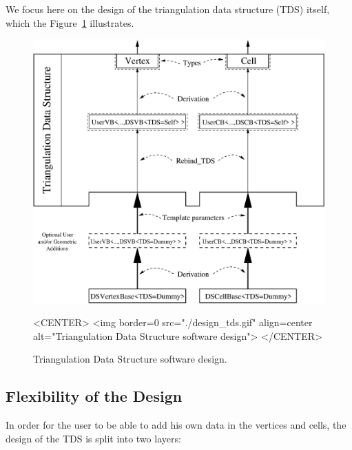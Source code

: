 We focus here on the design of the triangulation data structure (TDS)
itself, which the Figure~\ref{TDS3-fig-layers} illustrates.

\begin{figure}[htbp]
\begin{ccTexOnly}
\begin{center}
\includegraphics[width=14cm]{design_tds.eps}
\end{center}
\end{ccTexOnly}
\caption{Triangulation Data Structure software design.
\label{TDS3-fig-layers}}
\begin{ccHtmlOnly}
<CENTER>
<img border=0 src="./design_tds.gif" align=center
 alt="Triangulation Data Structure software design">
</CENTER>
\end{ccHtmlOnly}
\end{figure} 

\subsection{Flexibility of the Design}

In order for the user to be able to add his own data in the vertices and cells,
the design of the TDS is split into two layers:

